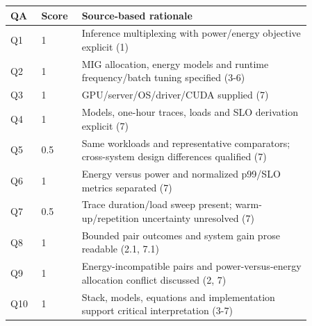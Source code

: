 \begin{longtable}{P{0.09\linewidth}P{0.10\linewidth}P{0.67\linewidth}}
\toprule QA & Score & Source-based rationale\\\midrule\endhead
Q1 & 1 & Inference multiplexing with power/energy objective explicit (1)\\
Q2 & 1 & MIG allocation, energy models and runtime frequency/batch tuning specified (3-6)\\
Q3 & 1 & GPU/server/OS/driver/CUDA supplied (7)\\
Q4 & 1 & Models, one-hour traces, loads and SLO derivation explicit (7)\\
Q5 & 0.5 & Same workloads and representative comparators; cross-system design differences qualified (7)\\
Q6 & 1 & Energy versus power and normalized p99/SLO metrics separated (7)\\
Q7 & 0.5 & Trace duration/load sweep present; warm-up/repetition uncertainty unresolved (7)\\
Q8 & 1 & Bounded pair outcomes and system gain prose readable (2.1, 7.1)\\
Q9 & 1 & Energy-incompatible pairs and power-versus-energy allocation conflict discussed (2, 7)\\
Q10 & 1 & Stack, models, equations and implementation support critical interpretation (3-7)\\
\bottomrule\end{longtable}

